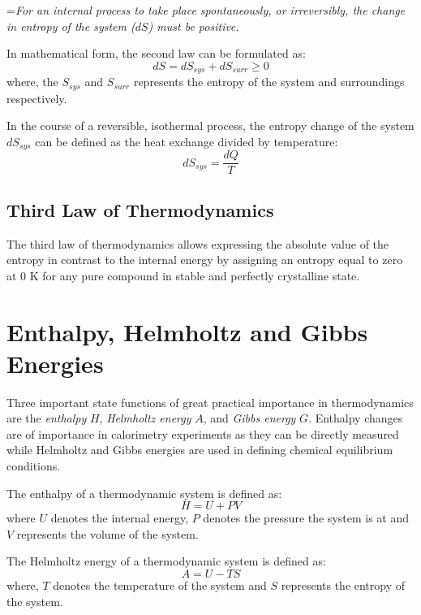 	\hangindent=\parindent \emph{For an internal process to take place spontaneously, or irreversibly, the change in entropy of the system ($dS$) must be positive.}
	
	\noindent In mathematical form, the second law can be formulated as:
	\begin{equation}\label{eqn:slot}
		dS = dS_{sys} + dS_{surr} \geq 0
	\end{equation}
	where, the $S_{sys}$ and $S_{surr}$ represents the entropy of the system and surroundings respectively.
	
	In the course of a reversible, isothermal process, the entropy change of the system $dS_{sys}$   can be defined as the heat exchange divided by temperature:
	\begin{equation}\label{eqn:slotrev}
		dS_{sys} = \frac{dQ}{T}
	\end{equation}
	
	\subsection{Third Law of Thermodynamics}
	The third law of thermodynamics allows expressing the absolute value of the entropy in contrast to the internal energy by assigning an entropy equal to zero at 0 K for any pure compound in stable and perfectly crystalline state.
	
\section{Enthalpy, Helmholtz and Gibbs Energies}
		Three important state functions of great practical importance in thermodynamics are the \emph{enthalpy} $H$, \emph{Helmholtz energy} $A$, and \emph{Gibbs energy} $G$. Enthalpy changes are of importance in calorimetry experiments as they can be directly measured while Helmholtz and Gibbs energies are used in defining chemical equilibrium conditions.
		
		The enthalpy of a thermodynamic system is defined as:
		\begin{equation}
			H = U + PV
		\end{equation}
		where $U$ denotes the internal energy, $P$ denotes the pressure the system is at and $V$ represents the volume of the system.
		
		The Helmholtz energy of a thermodynamic system is defined as:
		\begin{equation}
			A = U - TS
		\end{equation}
		where, $T$ denotes the temperature of  the system and $S$ represents the entropy of the system.
		
